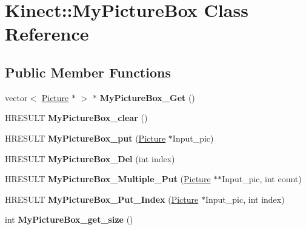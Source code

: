\hypertarget{class_kinect_1_1_my_picture_box}{}\section{Kinect\+:\+:My\+Picture\+Box Class Reference}
\label{class_kinect_1_1_my_picture_box}
\subsection*{Public Member Functions}
\begin{DoxyCompactItemize}
\item 
\mbox{\label{class_kinect_1_1_my_picture_box_a4f2ec23ce100bde8ac98ee525f58a54d}} 
vector$<$ \hyperlink{class_kinect_1_1_picture}{Picture} $\ast$ $>$ $\ast$ {\bfseries My\+Picture\+Box\+\_\+\+Get} ()
\item 
\mbox{\label{class_kinect_1_1_my_picture_box_a72d68069d5448c293dfde303c11a55b6}} 
H\+R\+E\+S\+U\+LT {\bfseries My\+Picture\+Box\+\_\+clear} ()
\item 
\mbox{\label{class_kinect_1_1_my_picture_box_a3f24944468b85f46e1ff19cf10f32259}} 
H\+R\+E\+S\+U\+LT {\bfseries My\+Picture\+Box\+\_\+put} (\hyperlink{class_kinect_1_1_picture}{Picture} $\ast$Input\+\_\+pic)
\item 
\mbox{\label{class_kinect_1_1_my_picture_box_abe16dbd8a20fccad0d27c3956f7deeb0}} 
H\+R\+E\+S\+U\+LT {\bfseries My\+Picture\+Box\+\_\+\+Del} (int index)
\item 
\mbox{\label{class_kinect_1_1_my_picture_box_a46accb1dd5029f692b003c9ccf902bea}} 
H\+R\+E\+S\+U\+LT {\bfseries My\+Picture\+Box\+\_\+\+Multiple\+\_\+\+Put} (\hyperlink{class_kinect_1_1_picture}{Picture} $\ast$$\ast$Input\+\_\+pic, int count)
\item 
\mbox{\label{class_kinect_1_1_my_picture_box_ade0798562c77fc8deae29d342d91b30a}} 
H\+R\+E\+S\+U\+LT {\bfseries My\+Picture\+Box\+\_\+\+Put\+\_\+\+Index} (\hyperlink{class_kinect_1_1_picture}{Picture} $\ast$Input\+\_\+pic, int index)
\item 
\mbox{\label{class_kinect_1_1_my_picture_box_a150f45f15d51b9abea0e96fcf9d18873}} 
int {\bfseries My\+Picture\+Box\+\_\+get\+\_\+size} ()
\end{DoxyCompactItemize}
